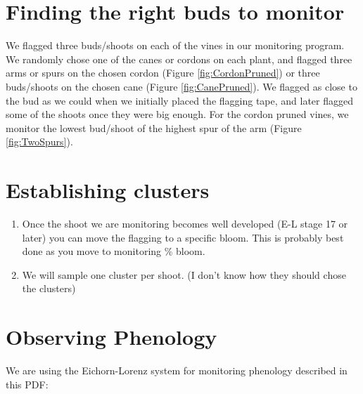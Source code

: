 \documentclass[11pt,letter]{article}
\begin{document}
\section{Finding the right buds to monitor}
We flagged three buds/shoots on each of the vines in our monitoring program. We randomly chose one of the canes or cordons on each plant, and flagged three arms or spurs on the chosen cordon (Figure \ref{fig:CordonPruned}) or three buds/shoots on the chosen cane (Figure \ref{fig:CanePruned}). We flagged as close to the bud as we could when we initially placed the flagging tape, and later flagged some of the shoots once they were big enough. For the cordon pruned vines, we monitor the lowest bud/shoot of the highest spur of the arm (Figure \ref{fig:TwoSpurs}). 

\section{Establishing clusters}
\begin{enumerate}
	\item Once the shoot we are monitoring becomes well developed (E-L stage 17 or later) you can move the flagging to a specific bloom. This is probably best done as you move to monitoring \% bloom. 
	\item We will sample one cluster per shoot. 
	(I don't know how they should chose the clusters)

\end{enumerate}

\section{Observing Phenology}
We are using the Eichorn-Lorenz system for monitoring phenology described in this PDF: \\
\end{document}
